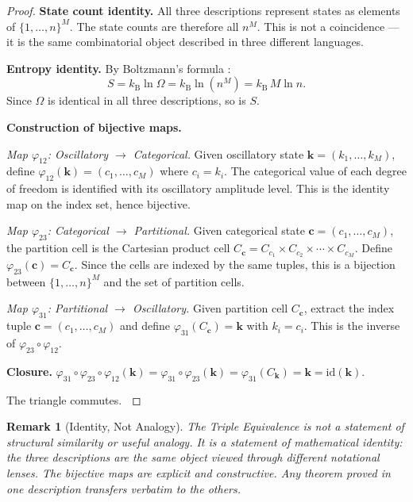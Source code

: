 \documentclass[11pt,twocolumn,a4paper]{article}
\newtheorem{remark}[theorem]{Remark}
\newcommand{\kb}{k_{\mathrm{B}}}
\begin{document}
\begin{proof}
\textbf{State count identity.} All three descriptions represent states
as elements of $\{1, \ldots, n\}^M$. The state counts are therefore
all $n^M$. This is not a coincidence --- it is the same combinatorial
object described in three different languages.

\textbf{Entropy identity.} By Boltzmann's formula
\citep{boltzmann1877}:
\begin{equation}
S = \kb \ln \Omega = \kb \ln(n^M) = \kb \, M \ln n.
\label{eq:boltzmann}
\end{equation}
Since $\Omega$ is identical in all three descriptions, so is $S$.

\textbf{Construction of bijective maps.}

\emph{Map $\varphi_{12}$: Oscillatory $\to$ Categorical.}
Given oscillatory state $\bm{k} = (k_1, \ldots, k_M)$, define
$\varphi_{12}(\bm{k}) = (c_1, \ldots, c_M)$ where $c_i = k_i$.
The categorical value of each degree of freedom is identified with
its oscillatory amplitude level. This is the identity map on the
index set, hence bijective.

\emph{Map $\varphi_{23}$: Categorical $\to$ Partitional.}
Given categorical state $\bm{c} = (c_1, \ldots, c_M)$, the partition
cell is the Cartesian product cell
$C_{\bm{c}} = C_{c_1} \times C_{c_2} \times \cdots \times C_{c_M}$.
Define $\varphi_{23}(\bm{c}) = C_{\bm{c}}$. Since the cells are
indexed by the same tuples, this is a bijection between
$\{1,\ldots,n\}^M$ and the set of partition cells.

\emph{Map $\varphi_{31}$: Partitional $\to$ Oscillatory.}
Given partition cell $C_{\bm{c}}$, extract the index tuple
$\bm{c} = (c_1, \ldots, c_M)$ and define
$\varphi_{31}(C_{\bm{c}}) = \bm{k}$ with $k_i = c_i$. This is the
inverse of $\varphi_{23} \circ \varphi_{12}$.

\textbf{Closure.}
$\varphi_{31} \circ \varphi_{23} \circ \varphi_{12}(\bm{k})
= \varphi_{31} \circ \varphi_{23}(\bm{k})
= \varphi_{31}(C_{\bm{k}}) = \bm{k} = \mathrm{id}(\bm{k}).$

The triangle commutes. $\qedhere$
\end{proof}


\begin{remark}[Identity, Not Analogy]
\label{rem:identity}
The Triple Equivalence is not a statement of structural similarity or
useful analogy. It is a statement of mathematical identity: the three
descriptions are the same object viewed through different notational
lenses. The bijective maps are explicit and constructive. Any
theorem proved in one description transfers verbatim to the others.
\end{remark}
\end{document}
